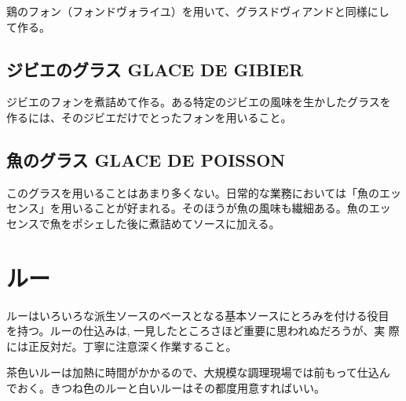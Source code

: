 \documentclass[twoside,12Q,b5paper,tombo]{escoffierltjsbook}
\newenvironment{recette}{\begin{multicols}{2}}{\end{multicols}}
\begin{document}
\begin{recette}
鶏のフォン（フォンドヴォライユ）を用いて、グラスドヴィアンドと同様にし
て作る。

\subsection{ジビエのグラス GLACE DE
GIBIER}\label{ux30b8ux30d3ux30a8ux306eux30b0ux30e9ux30b9-glace-de-gibier}

ジビエのフォンを煮詰めて作る。ある特定のジビエの風味を生かしたグラスを
作るには、そのジビエだけでとったフォンを用いること。

\subsection{魚のグラス GLACE DE
POISSON}\label{ux9b5aux306eux30b0ux30e9ux30b9-glace-de-poisson}

このグラスを用いることはあまり多くない。日常的な業務においては「魚のエッ
センス」を用いることが好まれる。そのほうが魚の風味も繊細ある。魚のエッ
センスで魚をポシェした後に煮詰めてソースに加える。

\end{recette}


\section{ルー}\label{ux30ebux30fc}

ルーはいろいろな派生ソースのベースとなる基本ソースにとろみを付ける役目
を持つ。ルーの仕込みは, 一見したところさほど重要に思われぬだろうが、実
際には正反対だ。丁寧に注意深く作業すること。

茶色いルーは加熱に時間がかかるので、大規模な調理現場では前もって仕込ん
でおく。きつね色のルーと白いルーはその都度用意すればいい。
\end{document}
